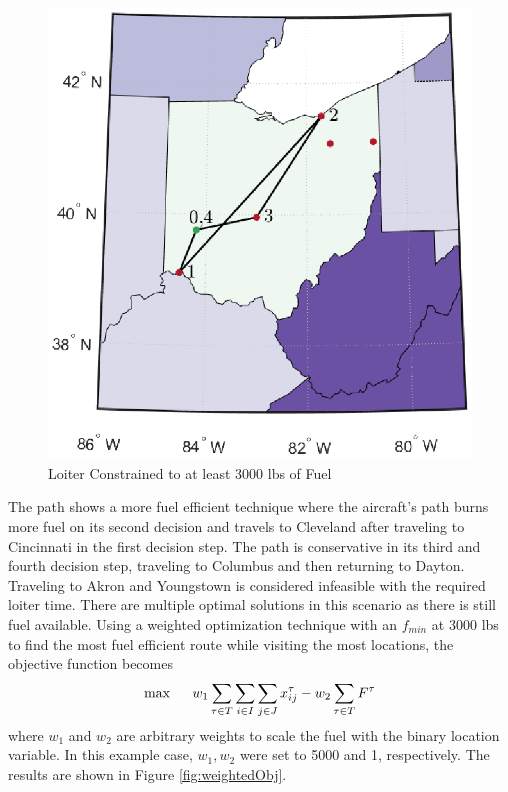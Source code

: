 \begin{figure}[h]
    \centering
    \includegraphics{Thesis/Method_II/fmin3000.eps}
    \caption{Loiter Constrained to at least 3000 lbs of Fuel}
    \label{fig:fmin3000}
\end{figure}
The path shows a more fuel efficient technique where the aircraft's path burns more fuel on its second decision and travels to Cleveland after traveling to Cincinnati in the first decision step. The path is conservative in its third and fourth decision step, traveling to Columbus and then returning to Dayton. Traveling to Akron and Youngstown is considered infeasible with the required loiter time. There are multiple optimal solutions in this scenario as there is still fuel available. Using a weighted optimization technique with an $f_{min}$ at $3000$ lbs to find the most fuel efficient route while visiting the most locations, the objective function becomes
\begin{equation}
    \max \hspace{.5cm} w_1\sum_{\tau\in T}\sum_{i\in I}\sum_{j\in J}x_{ij}^\tau-w_2\sum_{\tau\in T}F^\tau
\end{equation}
where $w_1$ and $w_2$ are arbitrary weights to scale the fuel with the binary location variable. In this example case, $w_1,w_2$ were set to 5000 and 1, respectively. The results are shown in Figure \ref{fig:weightedObj}.
